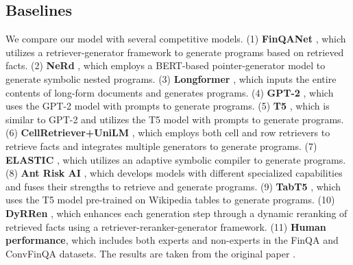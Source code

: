 \documentclass[11pt]{article}
\begin{document}
\subsection{Baselines}
We compare our model with several competitive models. (1) \textbf{FinQANet} \cite{chen2021finqa}, which utilizes a retriever-generator framework to generate programs based on retrieved facts. (2) \textbf{NeRd} \cite{nerd}, which employs a BERT-based pointer-generator model to generate symbolic nested programs. (3) \textbf{Longformer} \cite{beltagy2020longformer}, which inputs the entire contents of long-form documents and generates programs. (4) \textbf{GPT-2} \cite{gpt}, which uses the GPT-2 model with prompts to generate programs. (5) \textbf{T5} \cite{t5}, which is similar to GPT-2 and utilizes the T5 model with prompts to generate programs. (6) \textbf{CellRetriever+UniLM} \cite{wang2022numerical}, which employs both cell and row retrievers to retrieve facts and integrates multiple generators to generate programs. (7) \textbf{ELASTIC} \cite{zhang2022elastic}, which utilizes an adaptive symbolic compiler to generate programs. (8) \textbf{Ant Risk AI} \cite{zhang2022robustly}, which develops models with different specialized capabilities and fuses their strengths to retrieve and generate programs. (9) \textbf{TabT5} \cite{zhang2022robustly}, which uses the T5 model pre-trained on Wikipedia tables to generate programs. (10) \textbf{DyRRen} \cite{dyrren}, which enhances each generation step through a dynamic reranking of retrieved facts using a retriever-reranker-generator framework. (11) \textbf{Human performance}, which includes both experts and non-experts in the FinQA and ConvFinQA datasets. The results are taken from the original paper \cite{chen2021finqa, convfinqa}.
\end{document}
